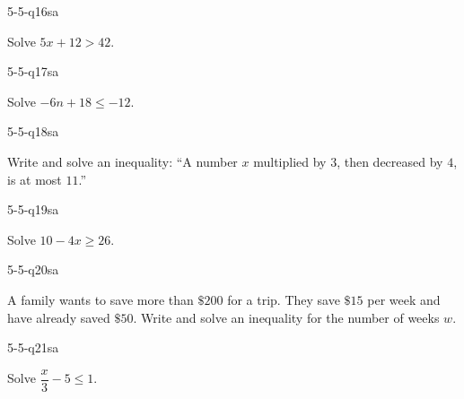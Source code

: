 
\begin{practiceQuestion}{5-5-q16}{sa}
\begin{questionText}
Solve $5x + 12 > 42$.
\end{questionText}
\end{practiceQuestion}

\begin{practiceQuestion}{5-5-q17}{sa}
\begin{questionText}
Solve $-6n + 18 \leq -12$.
\end{questionText}
\end{practiceQuestion}

\begin{practiceQuestion}{5-5-q18}{sa}
\begin{questionText}
Write and solve an inequality: ``A number $x$ multiplied by $3$, then decreased by $4$, is at most $11$.''
\end{questionText}
\end{practiceQuestion}

\begin{practiceQuestion}{5-5-q19}{sa}
\begin{questionText}
Solve $10 - 4x \geq 26$.
\end{questionText}
\end{practiceQuestion}

\begin{practiceQuestion}{5-5-q20}{sa}
\begin{questionText}
A family wants to save more than $\$200$ for a trip. They save $\$15$ per week and have already saved $\$50$. Write and solve an inequality for the number of weeks $w$.
\end{questionText}
\end{practiceQuestion}

\begin{practiceQuestion}{5-5-q21}{sa}
\begin{questionText}
Solve $\dfrac{x}{3} - 5 \leq 1$.
\end{questionText}
\end{practiceQuestion}

